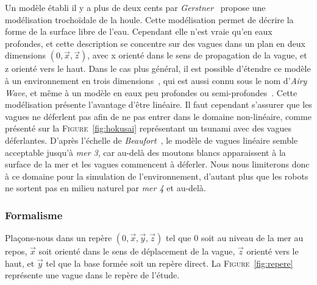 				Un modèle établi il y a plus de deux cents par \textit{Gerstner}~\cite{Gerstner} propose une modélisation trochoïdale de la houle. Cette modélisation permet de décrire la forme de la surface libre de l'eau. Cependant elle n'est vraie qu'en eaux profondes, et cette description se concentre sur des vagues dans un plan en deux dimensions $(0, \overrightarrow{x}, \overrightarrow{z})$, avec x orienté dans le sens de propagation de la vague, et z orienté vers le haut. Dans le cas plus général, il est possible d'étendre ce modèle à un environnement en trois dimensions~\cite{Constantin_2001, Gerstner-Like_Henry}, qui est aussi connu sous le nom d'\textit{Airy Wave}, et même à un modèle en eaux peu profondes ou semi-profondes~\cite{dean1991water}. Cette modélisation présente l'avantage d'être linéaire. Il faut cependant s'assurer que les vagues ne déferlent pas afin de ne pas entrer dans le domaine non-linéaire, comme présenté sur la \textsc{Figure}~\ref{fig:hokusai} représentant un tsunami avec des vagues déferlantes. D'après l'échelle de \textit{Beaufort}~\cite{beaufort}, le modèle de vagues linéaire semble acceptable jusqu'à \textit{mer 3}, car au-delà des moutons blancs apparaissent à la surface de la mer et les vagues commencent à déferler. Nous nous limiterons donc à ce domaine pour la simulation de l'environnement, d'autant plus que les robots ne sortent pas en milieu naturel par \textit{mer 4} et au-delà.

			\subsubsection{Formalisme}

				Plaçons-nous dans un repère $(0, \overrightarrow{x}, \overrightarrow{y}, \overrightarrow{z})$ tel que $0$ soit au niveau de la mer au repos, $\overrightarrow{x}$ soit orienté dans le sens de déplacement de la vague, $\overrightarrow{z}$ orienté vers le haut, et $\overrightarrow{y}$ tel que la base formée soit un repère direct. La \textsc{Figure}~\ref{fig:repere} représente une vague dans le repère de l'étude.

